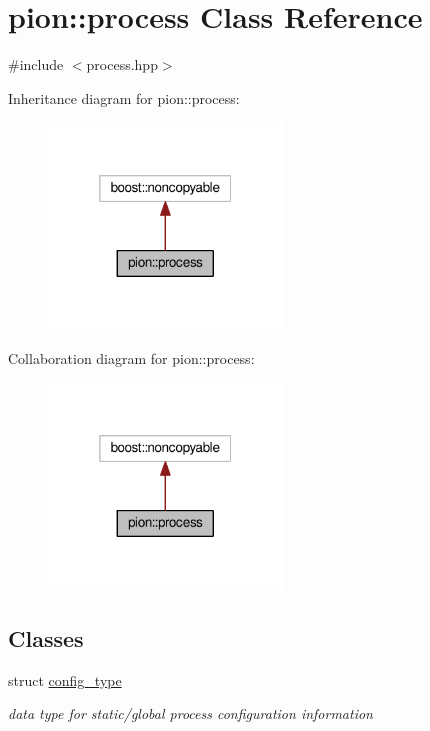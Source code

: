 \hypertarget{classpion_1_1process}{\section{pion\-:\-:process Class Reference}
\label{classpion_1_1process}
}


{\ttfamily \#include $<$process.\-hpp$>$}



Inheritance diagram for pion\-:\-:process\-:
\nopagebreak
\begin{figure}[H]
\begin{center}
\leavevmode
\includegraphics[width=176pt]{classpion_1_1process__inherit__graph}
\end{center}
\end{figure}


Collaboration diagram for pion\-:\-:process\-:
\nopagebreak
\begin{figure}[H]
\begin{center}
\leavevmode
\includegraphics[width=176pt]{classpion_1_1process__coll__graph}
\end{center}
\end{figure}
\subsection*{Classes}
\begin{DoxyCompactItemize}
\item 
struct \hyperlink{structpion_1_1process_1_1config__type}{config\-\_\-type}
\begin{DoxyCompactList}\small\item\em data type for static/global process configuration information \end{DoxyCompactList}\end{DoxyCompactItemize}
